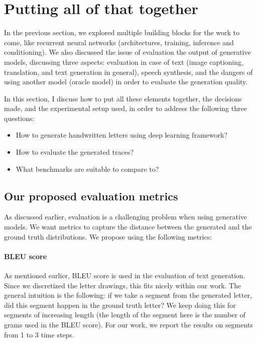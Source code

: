 
\section{Putting all of that together}
\par In the previous section, we explored multiple building blocks for the work to come, like recurrent neural networks (architectures, training, inference and conditioning). We also discussed the issue of evaluation the output of generative models, discussing three aspects: evaluation in case of text (image captioning, translation, and text generation in general), speech synthesis, and the dangers of using another model (oracle model) in order to evaluate the generation quality.

\par In this section, I discuss how to put all these elements together, the decisions made, and the experimental setup used, in order to address the following three questions:
\begin{itemize}
    \item How to generate handwritten letters using deep learning framework?
    \item How to evaluate the generated traces?
    \item What benchmarks are suitable to compare to?
\end{itemize}

\subsection{Our proposed evaluation metrics}\label{subsec:eval_metrics}
\par As discussed earlier, evaluation is a challenging problem when using generative models. We want metrics to capture the distance between the generated and the ground truth distributions. We propose using the following metrics:

\paragraph{BLEU score} As mentioned earlier, BLEU score is used in the evaluation of text generation. Since we discretized the letter drawings, this fits nicely within our work. The general intuition is the following: if we take a segment from the generated letter, did this segment happen in the ground truth letter? We keep doing this for segments of increasing length (the length of the segment here is the number of grams used in the BLEU score). For our work, we report the results on segments from 1 to 3 time steps.

